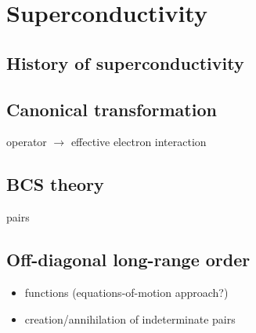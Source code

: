 
\chapter{Superconductivity}

\section{History of superconductivity}

\section{Canonical transformation}

 operator $\rightarrow$ effective electron interaction

\section{BCS theory}

 pairs

\section{Off-diagonal long-range order}

\begin{itemize}
    \item {} functions (equations-of-motion approach?)
    \item creation/annihilation of indeterminate  pairs
\end{itemize}
